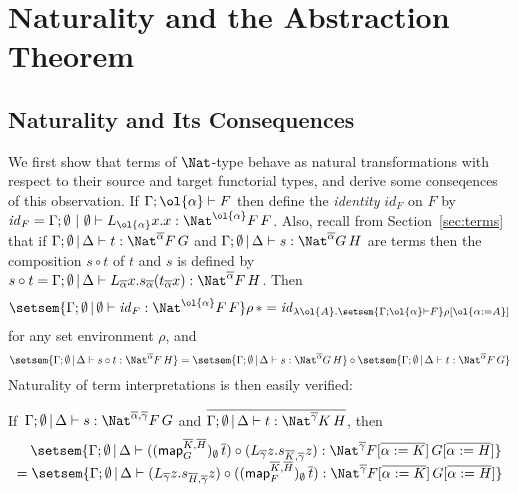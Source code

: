 \documentclass{lmcs}
\theoremstyle{plain}\newtheorem{satz}[thm]{Satz}
\renewcommand{\id}{\mathit{id}}
\newcommand{\map}{\mathsf{map}}
\begin{document}
\section{Naturality and the Abstraction Theorem}\label{sec:abs-and-nat}

\subsection{Naturality and Its Consequences}\label{sec:Nat-type-terms}

We first show that terms of $\Nat$-type behave as natural
transformations with respect to their source and target functorial
types, and derive some conseqences of this observation. If $\Gamma;
\ol{\alpha} \vdash F$ then define the {\em identity} $\id_F$ on $F$ by
$\id_F = \Gamma;\emptyset~|~\emptyset \vdash L_{\ol{\alpha}}x.x :
\Nat^{\ol{\alpha}} F\,F$. Also, recall from Section~\ref{sec:terms} that if
$\Gamma; \emptyset \,|\, \Delta \vdash t: \Nat^{\overline{\alpha}}
F\,G$ and $\Gamma; \emptyset \,|\, \Delta \vdash s:
\Nat^{\overline{\alpha}} G\,H$ are terms then the composition $s \circ
t$ of $t$ and $s$ is defined by $s \circ t = \Gamma; \emptyset\,|\,
\Delta \vdash L_{\overline{\alpha}}
x. s_{\overline{\alpha}}(t_{\overline{\alpha}}x):
\Nat^{\overline{\alpha}} F\,H$. Then \[\setsem{\Gamma; \emptyset \,|\,
  \emptyset \vdash \id_{F} : \Nat^{\ol{\alpha}} F\,F} \rho\, \ast =
\id_{\lambda \ol{A}. \setsem{\Gamma; \ol{\alpha} \vdash F} \rho
  [\ol{\alpha := A}]}\] for any set environment $\rho$, and
\[\setsem{\Gamma; \emptyset \,|\, \Delta \vdash s \circ t:
  \Nat^{\overline{\alpha}} F\,H} = \setsem{\Gamma; \emptyset \,|\,
  \Delta \vdash s: \Nat^{\overline{\alpha}} G\,H} \circ
\setsem{\Gamma; \emptyset \,|\, \Delta \vdash t:
  \Nat^{\overline{\alpha}} F\,G}\]
Naturality of term interpretations is then easily verified:
\begin{thm}\label{eq:ft-from-nat} 
  If\, $\Gamma; \emptyset \,|\, \Delta \vdash s : \Nat^{\overline{\alpha},
  \overline{\gamma}} F\,G$ and $\overline{\Gamma; \emptyset \,|\,
  \Delta \vdash t : \Nat^{\overline{\gamma}} K\, H}$, then
  \[\begin{array}{l}
  \hspace*{0.135in}
\setsem{\Gamma; \emptyset\,|\, \Delta
  \vdash 
  ((\map_G^{\overline{K}, \overline{H}})_\emptyset \,\overline{t}) \circ
(L_{\overline{\gamma}} z. s_{\overline{K}, \overline{\gamma}}
  z)
  : \Nat^{\overline{\gamma}} F[\overline{\alpha := K}]\,
  G[\overline{\alpha := H}]}\\
= \setsem{ \Gamma; \emptyset \,|\, \Delta \vdash
(L_{\overline{\gamma}} z.
  s_{\overline{H}, \overline{\gamma}} z)\circ
  ((\map_F^{\overline{K}, \overline{H}})_\emptyset \,
  \overline{t})  : \Nat^{\overline{\gamma}} F[\overline{\alpha :=
      K}]\, G[\overline{\alpha := H}]}
\end{array}\]
\end{thm}
\noindent
\end{document}
